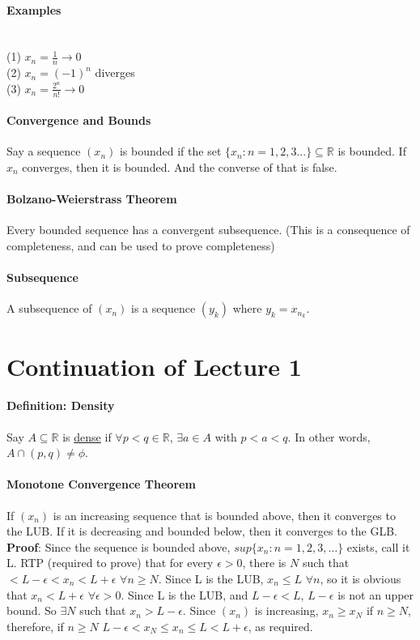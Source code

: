 \documentclass[10pt,letter]{article}
\begin{document}
\paragraph*{Examples}\mbox{}\\
(1) $x_n = \frac{1}{n} \rightarrow 0$\\
(2) $x_n = (-1)^n$ diverges \\ 
(3) $x_n = \frac{2^n}{n!} \rightarrow 0$\\

\paragraph*{Convergence and Bounds}
Say a sequence $(x_n)$ is bounded if the set $\{x_n: n=1,2,3...\}\subseteq\mathbb{R}$ is bounded. If $x_n$ converges, then it is bounded. And the converse of that is false. 

\paragraph*{Bolzano-Weierstrass Theorem}
Every bounded sequence has a convergent subsequence. (This is a consequence of completeness, and can be used to prove completeness)

\paragraph*{Subsequence}
A subsequence of $(x_n)$ is a sequence $(y_k)$ where $y_k = x_{n_k}$. 

\section*{Continuation of Lecture 1}

\paragraph*{Definition: Density}
Say $A\subseteq\mathbb{R}$ is \underline{dense} if $\forall p<q\in\mathbb{R}$, $\exists a\in A$ with $p<a<q$. In other words, $A\cap(p,q)\neq\phi$. 

\paragraph*{Monotone Convergence Theorem}
If $(x_n)$ is an increasing sequence that is bounded above, then it converges to the LUB. If it is decreasing and bounded below, then it converges to the GLB. \\ 
\textbf{Proof}: Since the sequence is bounded above, $sup\{x_n:n=1,2,3,\ldots\}$ exists, call it L. RTP (required to prove) that for every $\epsilon>0$, there is $N$ such that $<L-\epsilon<x_n<L+\epsilon$ $\forall n\geq N$. Since L is the LUB, $x_n\leq L$ $\forall n$, so it is obvious that $x_n<L+\epsilon$ $\forall\epsilon>0$. Since L is the LUB, and $L-\epsilon<L$, $L-\epsilon$ is not an upper bound. So $\exists N$ such that $x_n>L-\epsilon$. Since $(x_n)$ is increasing, $x_n\geq x_N$ if $n\geq N$, therefore, if $n\geq N$ $L-\epsilon<x_N\leq x_n\leq L<L+\epsilon$, as required. 
\end{document}
